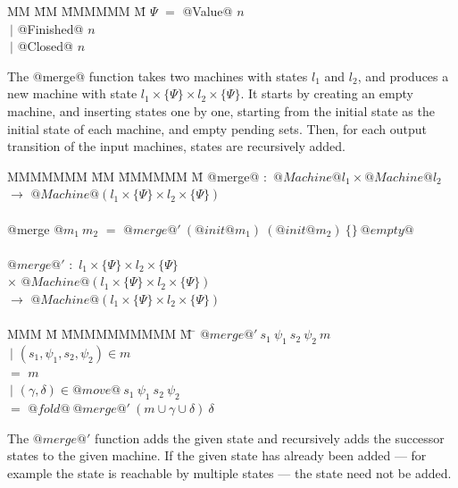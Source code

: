\begin{tabbing}
MM \= MM \= MMMMMM \= M\kill
$\Psi$ \> $=$  \> @Value@     \> $n$         \\
       \> $~|$ \> @Finished@  \> $n$         \\
       \> $~|$ \> @Closed@    \> $n$         \\
\end{tabbing}

The @merge@ function takes two machines with states $l_1$ and $l_2$, and produces a new machine with state $l_1 \times \{\Psi\} \times l_2 \times \{\Psi\}$.
It starts by creating an empty machine, and inserting states one by one, starting from the initial state as the initial state of each machine, and empty pending sets.
Then, for each output transition of the input machines, states are recursively added.

\begin{tabbing}
MMMMMMM \= MM \= MMMMMM \= M\kill
@merge@ \> $:$ \> $@Machine @l_1 \times @Machine @l_2$ \\
        \> $\to$ \> $@Machine @(l_1 \times \{\Psi\} \times l_2 \times \{\Psi\})$ \\
\\
@merge @$m_1~m_2$ \> $=$ \> $@merge@'~(@init @m_1)~(@init @m_2)~\{\}~@empty@$ \\
\\
$@merge@'$ \> $:$ \> $l_1 \times \{\Psi\} \times l_2 \times \{\Psi\}$               \\
           \> $\times$ \> $@Machine @(l_1 \times \{\Psi\} \times l_2 \times \{\Psi\})$ \\
           \> $\to$ \> $@Machine @(l_1 \times \{\Psi\} \times l_2 \times \{\Psi\})$ \\
\\
MMM \= M \= MMMMMMMMMM \= M \=\kill
$@merge@'~s_1~\psi_1~s_2~\psi_2~m$ \\
 \> $~|$ \> $(s_1, \psi_1, s_2, \psi_2) \in m$  \\
 \> $=$  \> $m$ \\
 \> $~|$ \> $(\gamma,\delta) \in @move@~s_1~\psi_1~s_2~\psi_2$ \\
 \> $=$  \> $@fold@~@merge@'~(m \cup \gamma \cup \delta)~\delta$ \\
\end{tabbing}

The $@merge@'$ function adds the given state and recursively adds the successor states to the given machine.
If the given state has already been added --- for example the state is reachable by multiple states --- the state need not be added.

